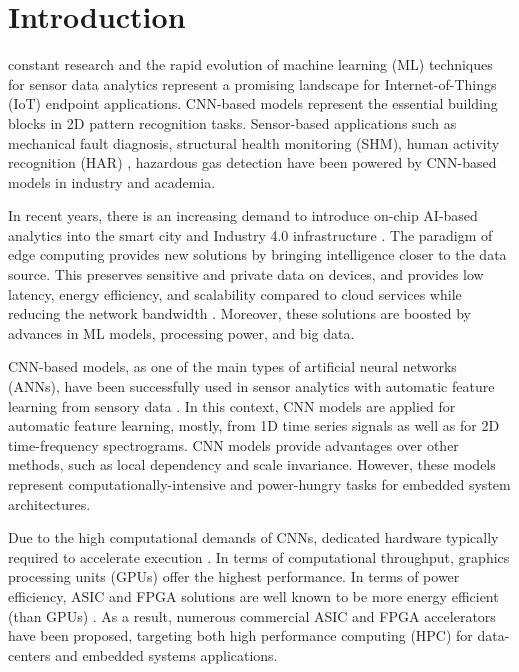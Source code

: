 
\section{Introduction}
\label{sec:introduction}

 constant research and the rapid evolution of machine learning (ML) techniques for sensor data analytics represent a promising landscape for  Internet-of-Things (IoT) endpoint applications. CNN-based models represent the essential building blocks in 2D pattern recognition tasks. Sensor-based applications such as mechanical fault diagnosis\cite{li2019sensor,dong2018rolling}, structural health monitoring (SHM)\cite{nagayama2007structural}, human activity recognition (HAR) \cite{wang2019deep}, hazardous gas detection\cite{kim2017hazardous} have been powered by CNN-based models in industry and academia.

\REVIEW
{
In recent years, there is an increasing demand to introduce on-chip AI-based analytics into the smart city and Industry 4.0 infrastructure \mbox{\cite{lom2016industry}}. The paradigm of edge computing provides new solutions by bringing intelligence closer to the data source. This preserves sensitive and private data on devices, and provides low latency, energy efficiency, and scalability compared to cloud services while reducing the network bandwidth \mbox{\cite{chen2019deep}}. Moreover, these solutions are boosted by advances in ML models, processing power, and big data.

CNN-based models, as one of the main types of artificial neural networks (ANNs),
have been successfully used in sensor analytics with automatic feature learning from sensory data \mbox{\cite{ince2016real, janssens2016convolutional, abdeljaber2017real, guo2016hierarchical}}. In this context, CNN models are applied for automatic feature learning, mostly, from 1D time series signals as well as for 2D time-frequency spectrograms. CNN models provide advantages over other methods, such as local dependency and scale invariance. However, these models represent computationally-intensive and power-hungry tasks for embedded system architectures.
}

Due to the high computational demands of CNNs, dedicated hardware  typically required to accelerate execution . In terms of computational throughput, graphics processing units (GPUs) offer the highest performance. In terms of power efficiency, ASIC and FPGA solutions are well known to be more energy efficient (than GPUs) \cite{nurvitadhi2017can}. As a result, numerous commercial ASIC and FPGA accelerators have been proposed, targeting both high performance computing (HPC) for data-centers and embedded systems applications.

